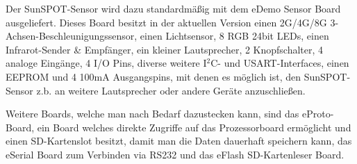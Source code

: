 Der SunSPOT-Sensor wird dazu standardmäßig mit dem eDemo Sensor Board ausgeliefert. Dieses Board besitzt in der aktuellen Version einen 2G/4G/8G 3-Achsen-Beschleunigungssensor, einen Lichtsensor, 8 RGB 24bit LEDs, einen Infrarot-Sender \& Empfänger, ein kleiner Lautsprecher, 2 Knopfschalter, 4 analoge Eingänge, 4 I/O Pins, diverse weitere I$^2$C- und USART-Interfaces, einen EEPROM und 4 100mA Ausgangspins, mit denen es möglich ist, den SunSPOT-Sensor z.b. an weitere Lautsprecher oder andere Geräte anzuschließen.

Weitere Boards, welche man nach Bedarf dazustecken kann, sind das eProto-Board, ein Board welches direkte Zugriffe auf das Prozessorboard ermöglicht und einen SD-Kartenslot besitzt, damit man die Daten dauerhaft speichern kann, das eSerial Board zum Verbinden via RS232 und das eFlash SD-Kartenleser Board.
\cite{d:horan}
\cite{d:spotmain}
\cite{d:spotdemo}
\\

 